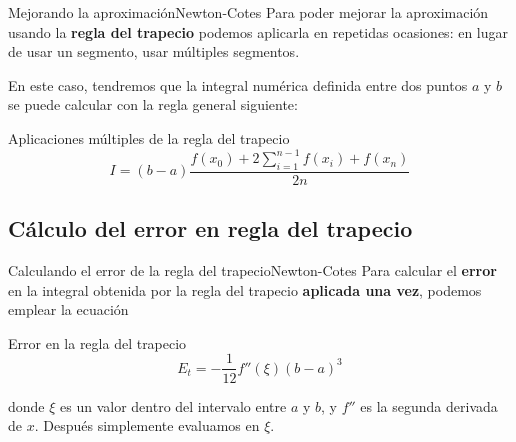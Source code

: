 \documentclass[spanish, c, dvipsnames]{beamer}
\begin{document}
\begin{frame}{Mejorando la aproximación}{Newton-Cotes}
    Para poder mejorar la aproximación usando la \textbf{regla del trapecio} podemos aplicarla en repetidas ocasiones: en lugar de usar un segmento, usar \alert{múltiples segmentos}.

    En este caso, tendremos que la integral numérica definida entre dos puntos $a$ y $b$ se puede calcular con la regla general siguiente:

    \bigskip

    \begin{block}{Aplicaciones múltiples de la regla del trapecio}
        \begin{equation}
            \label{eq:trapezoidal-multi}
            I = (b-a)\frac{f(x_0) + 2 \sum\limits_{i=1}^{n-1} f(x_i) + f(x_n)}{2n}
        \end{equation}
    \end{block}    

\end{frame}

\subsection{Cálculo del error en regla del trapecio}

\begin{frame}{Calculando el error de la regla del trapecio}{Newton-Cotes}
    Para calcular el \textbf{error} en la integral obtenida por la regla del trapecio \textbf{aplicada una vez}, podemos emplear la ecuación

    \bigskip

    \begin{block}{Error en la regla del trapecio}
        \begin{equation}
            \label{eq:trapezoidal-single-error}
            E_t = -\frac{1}{12} f''(\xi)(b-a)^3
        \end{equation}
    \end{block}

    \bigskip

    donde $\xi$ es un valor dentro del intervalo entre $a$ y $b$, y $f''$ es la segunda derivada de $x$. Después simplemente evaluamos en $\xi$.
\end{frame}
\end{document}

